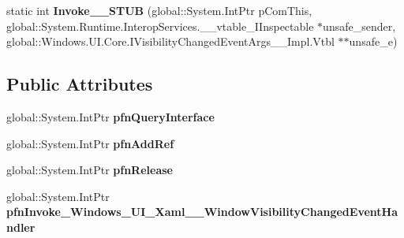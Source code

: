 \begin{DoxyCompactItemize}
\item 
\mbox{\label{struct_windows_1_1_u_i_1_1_xaml_1_1_window_visibility_changed_event_handler_____impl_1_1_vtbl_a77ce16ce6a1f680bf6419d18648863fc}} 
static int {\bfseries Invoke\+\_\+\+\_\+\+S\+T\+UB} (global\+::\+System.\+Int\+Ptr p\+Com\+This, global\+::\+System.\+Runtime.\+Interop\+Services.\+\_\+\+\_\+vtable\+\_\+\+I\+Inspectable $\ast$unsafe\+\_\+sender, global\+::\+Windows.\+U\+I.\+Core.\+I\+Visibility\+Changed\+Event\+Args\+\_\+\+\_\+\+Impl.\+Vtbl $\ast$$\ast$unsafe\+\_\+e)
\end{DoxyCompactItemize}
\subsection*{Public Attributes}
\begin{DoxyCompactItemize}
\item 
\mbox{\label{struct_windows_1_1_u_i_1_1_xaml_1_1_window_visibility_changed_event_handler_____impl_1_1_vtbl_a2f470f28aa37d272dadb473b2dcacd5b}} 
global\+::\+System.\+Int\+Ptr {\bfseries pfn\+Query\+Interface}
\item 
\mbox{\label{struct_windows_1_1_u_i_1_1_xaml_1_1_window_visibility_changed_event_handler_____impl_1_1_vtbl_a41d7090acec887f35fd5794163898f3a}} 
global\+::\+System.\+Int\+Ptr {\bfseries pfn\+Add\+Ref}
\item 
\mbox{\label{struct_windows_1_1_u_i_1_1_xaml_1_1_window_visibility_changed_event_handler_____impl_1_1_vtbl_aa6fcd430455c84e7f4f9d66e296e4ea4}} 
global\+::\+System.\+Int\+Ptr {\bfseries pfn\+Release}
\item 
\mbox{\label{struct_windows_1_1_u_i_1_1_xaml_1_1_window_visibility_changed_event_handler_____impl_1_1_vtbl_a4f1e8e5693eb6f44aff9fc34335a4753}} 
global\+::\+System.\+Int\+Ptr {\bfseries pfn\+Invoke\+\_\+\+Windows\+\_\+\+U\+I\+\_\+\+Xaml\+\_\+\+\_\+\+Window\+Visibility\+Changed\+Event\+Handler}
\end{DoxyCompactItemize}
